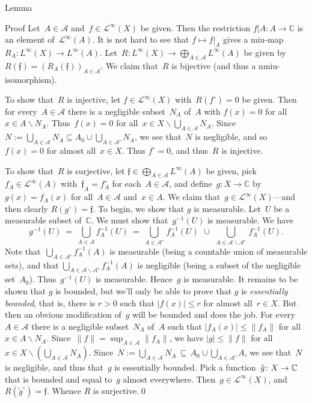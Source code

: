 \documentclass[a]{subfiles}
\begin{document}
\begin{parsec}
\begin{point}{Lemma}
\begin{point}{Proof}
Let~$A\in \mathcal{A}$
and~$f \in \mathcal{L}^\infty(X)$ be given.
Then the restriction $f|A\colon A\to \mathbb{C}$
is an element of~$\mathcal{L}^\infty(A)$.
It is not hard to see that $f\mapsto f|_A$
gives a miu-map
$R_A\colon L^\infty(X)\to L^\infty(A)$.
Let~$R\colon L^\infty(X)\to \bigoplus_{A\in \mathcal{A}} L^\infty(A)$
be given by $R(\mathfrak{f}) = (R_A(\mathfrak{f}))_{A\in \mathcal{A}}$.
We claim that~$R$ is bijective (and thus a nmiu-isomorphism).

To show that~$R$ is injective,
let $f\in \mathcal{L}^\infty(X)$ with~$R(f^\circ)=0$ be given.
Then for every~$A\in \mathcal{A}$
there is a negligible subset~$N_A$ of~$A$ with $f(x)=0$
for all~$x\in A\backslash N_A$.
Thus~$f(x)=0$ for all~$x\in X\backslash\bigcup_{A\in \mathcal{A}} N_A$.
Since~$N := \bigcup_{A\in\mathcal{A}} N_A 
\subseteq A_0 \cup \bigcup_{A\in\mathcal{A}'} N_A$,
we see that~$N$ is negligible,
and so~$f(x)=0$ for almost all~$x\in X$.
Thus $f^\circ =0$,
and thus~$R$ is injective.

To show that~$R$ is surjective,
let $\mathfrak{f}\in \bigoplus_{A\in \mathcal{A}} L^\infty(A)$
be given,
pick~$f_A\in\mathcal{L}^\infty(A)$
with~$\mathfrak{f}_A=f_A^\circ$
for each~$A\in\mathcal{A}$,
and define~$g\colon X\to \mathbb{C}$
by $g(x)=f_A(x)$
for all~$A\in\mathcal{A}$ and~$x\in A$.
We claim that~$g\in \mathcal{L}^\infty(X)$---and then 
clearly $R(g^\circ )=\mathfrak{f}$.
To begin, we show that $g$ is measurable.
Let~$U$ be a measurable subset of~$\mathbb{C}$.
We must show that~$g^{-1}(U)$ is measurable.
We have
\begin{equation*}
\textstyle 
g^{-1}(U)\ = \ \bigcup_{A\in \mathcal{A}} f^{-1}_A(U)
\ = \ \bigcup_{A\in \mathcal{A}'} \, f^{-1}_A(U)
\ \,\cup\ \,\bigcup_{A\in \mathcal{A}\backslash \mathcal{A}'}\, f^{-1}_A(U).
\end{equation*}
Note that~$\bigcup_{A\in\mathcal{A}'}f_A^{-1}(A)$
is measurable
(being a countable union of measurable sets),
and that $\bigcup_{A\in\mathcal{A}\backslash\mathcal{A}'} f_A^{-1}(A)$
is negligible
(being a subset of the negligible set~$A_0$).
Thus~$g^{-1}(U)$ is measurable.
Hence~$g$ is measurable.
It remains to be shown
that $g$ is bounded,
but we'll only be able
to prove that $g$ is \emph{essentially bounded},
that is, there is $r>0$ such that $|f(x)|\leq r$
for almost all~$r\in X$.
But then an obvious modification
of~$g$ will be bounded
and does the job.
For every~$A\in\mathcal{A}$
there is a negligible
subset~$N_A$ of~$A$
such that $|f_A(x)|\leq \|f_A\|$
for all~$x\in A\backslash N_A$.
Since~$\|f\|=\sup_{A\in\mathcal{A}}\|f_A\|$,
we have $|g|\leq \|f\|$
for all~$x\in X\backslash (\bigcup_{A\in\mathcal{A}}N_A)$.
Since~$N:=\bigcup_{A\in\mathcal{A}}N_A\,\subseteq\,
A_0\cup\bigcup_{A\in\mathcal{A}'}A$,
we see that~$N$ is negligible,
and thus that~$g$ is essentially bounded.
Pick a function~$\tilde{g}\colon X\to \mathbb{C}$
that is bounded and equal to~$g$ almost everywhere.
Then~$g\in\mathcal{L}^\infty(X)$,
and $R(\tilde{g}^\circ)=\mathfrak{f}$.
Whence $R$ is surjective.\qed
\end{point}
\end{point}


\end{parsec}
\end{document}
